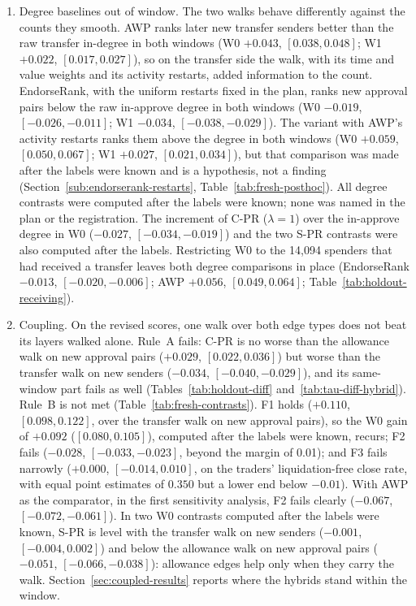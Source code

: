 \begin{enumerate}
\item[C4.] Degree baselines out of window. The two walks behave differently against the counts they smooth. AWP ranks later new transfer senders better than the raw transfer in-degree in both windows (W0 $+0.043$, $[0.038,0.048]$; W1 $+0.022$, $[0.017,0.027]$), so on the transfer side the walk, with its time and value weights and its activity restarts, added information to the count. EndorseRank, with the uniform restarts fixed in the plan, ranks new approval pairs below the raw in-approve degree in both windows (W0 $-0.019$, $[-0.026,-0.011]$; W1 $-0.034$, $[-0.038,-0.029]$). The variant with AWP's activity restarts ranks them above the degree in both windows (W0 $+0.059$, $[0.050,0.067]$; W1 $+0.027$, $[0.021,0.034]$), but that comparison was made after the labels were known and is a hypothesis, not a finding (Section~\ref{sub:endorserank-restarts}, Table~\ref{tab:fresh-posthoc}). All degree contrasts were computed after the labels were known; none was named in the plan or the registration. The increment of C-PR ($\lambda=1$) over the in-approve degree in W0 ($-0.027$, $[-0.034,-0.019]$) and the two S-PR contrasts were also computed after the labels. Restricting W0 to the 14,094 spenders that had received a transfer leaves both degree comparisons in place (EndorseRank $-0.013$, $[-0.020,-0.006]$; AWP $+0.056$, $[0.049,0.064]$; Table~\ref{tab:holdout-receiving}).
\item[C5.] Coupling. On the revised scores, one walk over both edge types does not beat its layers walked alone. Rule~A fails: C-PR is no worse than the allowance walk on new approval pairs ($+0.029$, $[0.022,0.036]$) but worse than the transfer walk on new senders ($-0.034$, $[-0.040,-0.029]$), and its same-window part fails as well (Tables~\ref{tab:holdout-diff} and~\ref{tab:tau-diff-hybrid}). Rule~B is not met (Table~\ref{tab:fresh-contrasts}). F1 holds ($+0.110$, $[0.098,0.122]$, over the transfer walk on new approval pairs), so the W0 gain of $+0.092$ ($[0.080,0.105]$), computed after the labels were known, recurs; F2 fails ($-0.028$, $[-0.033,-0.023]$, beyond the margin of 0.01); and F3 fails narrowly ($+0.000$, $[-0.014,0.010]$, on the traders' liquidation-free close rate, with equal point estimates of $0.350$ but a lower end below $-0.01$). With AWP as the comparator, in the first sensitivity analysis, F2 fails clearly ($-0.067$, $[-0.072,-0.061]$). In two W0 contrasts computed after the labels were known, S-PR is level with the transfer walk on new senders ($-0.001$, $[-0.004,0.002]$) and below the allowance walk on new approval pairs ($-0.051$, $[-0.066,-0.038]$): allowance edges help only when they carry the walk. Section~\ref{sec:coupled-results} reports where the hybrids stand within the window.

\end{enumerate}
